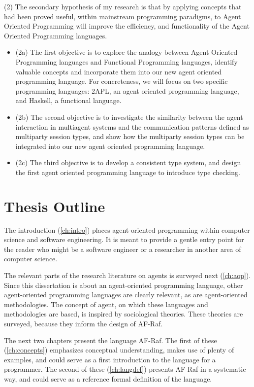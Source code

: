 \documentclass[a4paper,12pt,oneside,fleqn]{book} %
\newcommand{\rg}[1]{\marginpar{\tiny\raggedright\textcolor{blue}{\bf rg:} #1}}
\renewcommand{\rg}{}
\begin{document}
(2) The secondary hypothesis of my research is that by applying concepts
that had been proved useful, within mainstream programming paradigms, to
Agent Oriented Programming will improve the efficiency, and functionality
of the Agent Oriented Programming languages. 
\begin{itemize}

  \item (2a) The first objective is to explore the analogy between Agent
    Oriented Programming languages and Functional Programming languages,
    identify valuable concepts and incorporate them into our new agent
    oriented programming language. For concreteness, we will focus on two
    specific programming languages: 2APL, an agent oriented programming
    language, and Haskell, a functional language. 

  \item (2b) The second objective is to investigate the similarity between
    the agent interaction in multiagent systems and the communication
    patterns defined as multiparty session types, and show how the
    multiparty session types can be integrated into our new agent oriented
    programming language.

  \item (2c) The third objective is to develop a consistent type system,
    and design the first agent oriented programming language to introduce
    type checking.

\end{itemize}
\section{Thesis Outline}

The introduction (\autoref{ch:intro}) places agent-oriented programming
within computer science and software engineering. It is meant to provide a
gentle entry point for the reader who might be a software engineer or a
researcher in another area of computer science.

The relevant parts of the research literature on agents is surveyed next
(\autoref{ch:aop}). Since this dissertation is about an agent-oriented
programming language, other agent-oriented programming languages are
clearly relevant, as are agent-oriented methodologies. The concept of
agent, on which these languages and methodologies are based, is inspired by
sociological theories. These theories are surveyed, because they inform the
design of AF-Raf.

The next two chapters present the language AF-Raf. The first of these
(\autoref{ch:concepts}) emphasizes conceptual understanding, makes use of
plenty of examples, and could serve as a first introduction to the language
for a programmer. The second of these (\autoref{ch:langdef}) presents
AF-Raf in a systematic way, and could serve as a reference formal
definition of the language.
\end{document}
